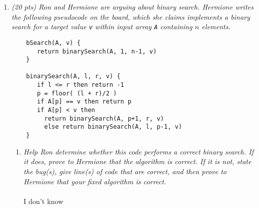 \documentclass[12pt]{article}
\begin{document}
\begin{enumerate}
\begin{enumerate}
	\pagebreak
	
	\item \label{3b} {\itshape Using a loop invariant, prove that your algorithm is correct. Be sure that your loop invariant and proof covers the initialization, maintenance, and termination conditions.}
	\\ \\I don't know
	\pagebreak
	\end{enumerate}
	
	
	
	\item {\itshape (20 pts) Ron and Hermione are arguing about binary search. Hermione writes the following pseudocode on the board, which she claims implements a binary search for a target value {\tt v} within input array {\tt A} containing $n$ elements.
	\begin{small}
	\begin{verbatim}
	bSearch(A, v) {
	   return binarySearch(A, 1, n-1, v)
	}
	
	binarySearch(A, l, r, v) {
	   if l <= r then return -1
	   p = floor( (l + r)/2 )
	   if A[p] == v then return p
	   if A[p] < v then
	     return binarySearch(A, p+1, r, v)
	     else return binarySearch(A, l, p-1, v)
	}
	\end{verbatim}
	\end{small}
}
	\begin{enumerate}
	\item \label{4a} {\itshape Help Ron determine whether this code performs a correct binary search. If it does, prove to Hermione that the algorithm is correct. If it is not, state the bug(s), give line(s) of code that are correct, and then prove to Hermione that your fixed algorithm is correct.}
	\\ \\ I don't know
	\newpage
	\phantom{} %
	\newpage
	

\end{enumerate}
\end{enumerate}
\end{document}
